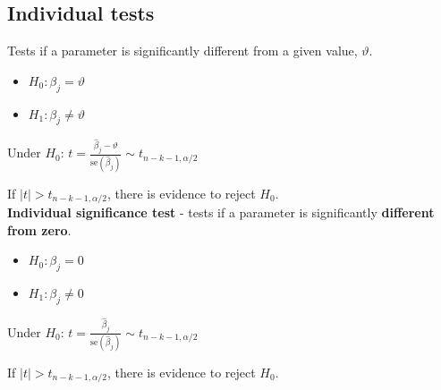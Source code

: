 \documentclass[10pt, a4paper, landscape]{extarticle}
\newcommand{\se}{\mathrm{se}}
\begin{document}
\begin{multicols}{3}
	\subsection*{Individual tests}
		Tests if a parameter is significantly different from a given value, $\vartheta$.
		\begin{itemize}[leftmargin=*]
			\item $H_0: \beta_j = \vartheta$
			\item $H_1: \beta_j \neq \vartheta$
		\end{itemize}
		\begin{center}
			Under $H_0$: \quad
			$t = \frac{\hat{\beta}_j - \vartheta}{\se(\hat{\beta}_j)} \sim t_{n-k-1, \alpha/2}$
		\end{center}
		If $\mid t \mid > t_{n-k-1, \alpha/2}$, there is evidence to reject $H_0$. \\
		\textbf{Individual significance test} - tests if a parameter is significantly \textbf{different from zero}.
		\begin{itemize}[leftmargin=*]
			\item $H_0: \beta_j = 0$
			\item $H_1: \beta_j \neq 0$
		\end{itemize}
		\begin{center}
			Under $H_0$: \quad
			$t = \frac{\hat{\beta}_j}{\se(\hat{\beta}_j)} \sim t_{n-k-1, \alpha/2}$
		\end{center}
		If $\mid t \mid > t_{n-k-1, \alpha/2}$, there is evidence to reject $H_0$.

\end{multicols}
\end{document}
